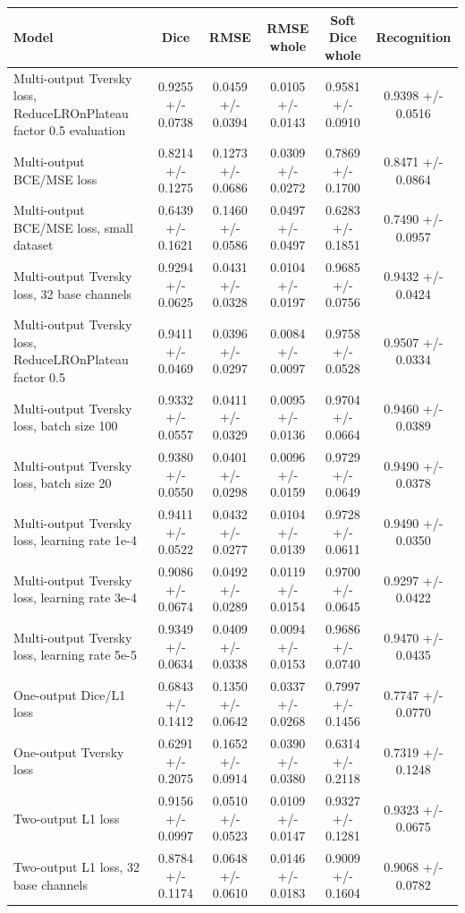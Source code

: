 \begin{tabular}{lccccc}
\toprule
Model & Dice & RMSE & RMSE whole & Soft Dice whole & Recognition \\
\midrule
Multi-output Tversky loss, ReduceLROnPlateau factor 0.5 evaluation & 0.9255 +/- 0.0738 & 0.0459 +/- 0.0394 & 0.0105 +/- 0.0143 & 0.9581 +/- 0.0910 & 0.9398 +/- 0.0516 \\
Multi-output BCE/MSE loss & 0.8214 +/- 0.1275 & 0.1273 +/- 0.0686 & 0.0309 +/- 0.0272 & 0.7869 +/- 0.1700 & 0.8471 +/- 0.0864 \\
Multi-output BCE/MSE loss, small dataset & 0.6439 +/- 0.1621 & 0.1460 +/- 0.0586 & 0.0497 +/- 0.0497 & 0.6283 +/- 0.1851 & 0.7490 +/- 0.0957 \\
Multi-output Tversky loss, 32 base channels & 0.9294 +/- 0.0625 & 0.0431 +/- 0.0328 & 0.0104 +/- 0.0197 & 0.9685 +/- 0.0756 & 0.9432 +/- 0.0424 \\
Multi-output Tversky loss, ReduceLROnPlateau factor 0.5 & 0.9411 +/- 0.0469 & 0.0396 +/- 0.0297 & 0.0084 +/- 0.0097 & 0.9758 +/- 0.0528 & 0.9507 +/- 0.0334 \\
Multi-output Tversky loss, batch size 100 & 0.9332 +/- 0.0557 & 0.0411 +/- 0.0329 & 0.0095 +/- 0.0136 & 0.9704 +/- 0.0664 & 0.9460 +/- 0.0389 \\
Multi-output Tversky loss, batch size 20 & 0.9380 +/- 0.0550 & 0.0401 +/- 0.0298 & 0.0096 +/- 0.0159 & 0.9729 +/- 0.0649 & 0.9490 +/- 0.0378 \\
Multi-output Tversky loss, learning rate 1e-4 & 0.9411 +/- 0.0522 & 0.0432 +/- 0.0277 & 0.0104 +/- 0.0139 & 0.9728 +/- 0.0611 & 0.9490 +/- 0.0350 \\
Multi-output Tversky loss, learning rate 3e-4 & 0.9086 +/- 0.0674 & 0.0492 +/- 0.0289 & 0.0119 +/- 0.0154 & 0.9700 +/- 0.0645 & 0.9297 +/- 0.0422 \\
Multi-output Tversky loss, learning rate 5e-5 & 0.9349 +/- 0.0634 & 0.0409 +/- 0.0338 & 0.0094 +/- 0.0153 & 0.9686 +/- 0.0740 & 0.9470 +/- 0.0435 \\
One-output Dice/L1 loss & 0.6843 +/- 0.1412 & 0.1350 +/- 0.0642 & 0.0337 +/- 0.0268 & 0.7997 +/- 0.1456 & 0.7747 +/- 0.0770 \\
One-output Tversky loss & 0.6291 +/- 0.2075 & 0.1652 +/- 0.0914 & 0.0390 +/- 0.0380 & 0.6314 +/- 0.2118 & 0.7319 +/- 0.1248 \\
Two-output L1 loss & 0.9156 +/- 0.0997 & 0.0510 +/- 0.0523 & 0.0109 +/- 0.0147 & 0.9327 +/- 0.1281 & 0.9323 +/- 0.0675 \\
Two-output L1 loss, 32 base channels & 0.8784 +/- 0.1174 & 0.0648 +/- 0.0610 & 0.0146 +/- 0.0183 & 0.9009 +/- 0.1604 & 0.9068 +/- 0.0782 \\

\end{tabular}
